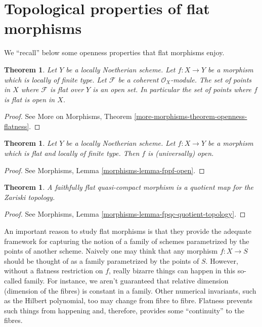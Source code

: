 \documentclass{stacks-project}
\theoremstyle{plain}
\newtheorem{theorem}[subsection]{Theorem}
\theoremstyle{definition}
\theoremstyle{remark}
\numberwithin{equation}{subsection}
\begin{document}
\section{Topological properties of flat morphisms}
\label{section-topological-flat}

\noindent
We ``recall'' below some openness properties that flat morphisms enjoy.

\begin{theorem}
\label{theorem-flat-open}
Let $Y$ be a locally Noetherian scheme.
Let $f : X \to Y$ be a morphism which is locally of finite type.
Let $\mathcal{F}$ be a coherent $\mathcal{O}_X$-module.
The set of points in $X$ where $\mathcal{F}$ is flat over $Y$ is an open set.
In particular the set of points where $f$ is flat is open in $X$.
\end{theorem}

\begin{proof}
See More on Morphisms, Theorem \ref{more-morphisms-theorem-openness-flatness}.
\end{proof}

\begin{theorem}
\label{theorem-flat-map-open}
Let $Y$ be a locally Noetherian scheme.
Let $f : X \to Y$ be a morphism which is flat and locally of finite type.
Then $f$ is (universally) open.
\end{theorem}

\begin{proof}
See Morphisms, Lemma \ref{morphisms-lemma-fppf-open}.
\end{proof}

\begin{theorem}
\label{theorem-flat-is-quotient}
A faithfully flat quasi-compact morphism is a quotient map for
the Zariski topology.
\end{theorem}

\begin{proof}
See Morphisms, Lemma \ref{morphisms-lemma-fpqc-quotient-topology}.
\end{proof}

\noindent
An important reason to study flat morphisms is that they provide the adequate
framework for capturing the notion of a family of schemes parametrized by the
points of another scheme. Naively one may think that any morphism $f : X \to S$
should be thought of as a family parametrized by the points of $S$. However,
without a flatness restriction on $f$, really bizarre things can happen in
this so-called family. For instance, we aren't guaranteed that relative
dimension (dimension of the fibres) is constant in a family. Other numerical
invariants, such as the Hilbert polynomial, too may change from fibre to
fibre. Flatness prevents such things from happening and, therefore, provides
some ``continuity'' to the fibres.
\end{document}
